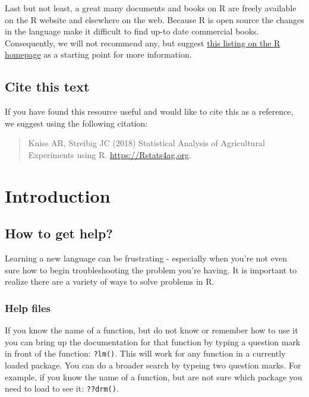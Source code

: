\documentclass[letterpaper,]{book}
\begin{document}
Last but not least, a great many documents and books on R are freely available on the R website and elsewhere on the web. Because R is open source the changes in the language make it difficult to find up-to date commercial books. Consequently, we will not recommend any, but suggest \href{http://cran.r-project.org/other-docs.html}{this listing on the R homepage} as a starting point for more information.

\hypertarget{cite-this-text}{%
\section*{Cite this text}\label{cite-this-text}}

If you have found this resource useful and would like to cite this as a reference, we suggest using the following citation:

\begin{quote}
Kniss AR, Streibig JC (2018) Statistical Analysis of Agricultural Experiments using R. \url{https://Rstats4ag.org}. \protect\hypertarget{datetime}{}{}
\end{quote}

\hypertarget{intro}{%
\chapter{Introduction}\label{intro}}

\hypertarget{help}{%
\section{How to get help?}\label{help}}

Learning a new language can be frustrating - especially when you're not even sure how to begin troubleshooting the problem you're having. It is important to realize there are a variety of ways to solve problems in R.

\hypertarget{help-files}{%
\subsection{Help files}\label{help-files}}

If you know the name of a function, but do not know or remember how to use it you can bring up the documentation for that function by typing a question mark in front of the function: \texttt{?lm()}. This will work for any function in a currently loaded package. You can do a broader search by typeing two question marks. For example, if you know the name of a function, but are not sure which package you need to load to see it: \texttt{??drm()}.
\end{document}
